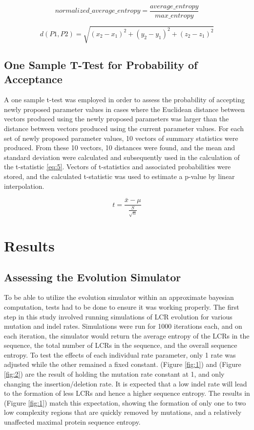 \documentclass[10pt]{article}
\providecommand{\figref}[1]{(Figure \ref{#1})}  %
\begin{document}
\begin{equation}
	normalized\_average\_entropy = \frac{average\_entropy}{max\_entropy}
	\label{eq:3}
\end{equation}

\begin{equation}
	d(P1,P2) = \sqrt{(x_2-x_1)^2 + (y_2-y_1)^2 + (z_2-z_1)^2 }
	\label{eq:4}
\end{equation}

\subsection{One Sample T-Test for Probability of Acceptance}

A one sample t-test was employed in order to assess the probability of accepting newly proposed parameter values in cases where the Euclidean distance between vectors produced using the newly proposed parameters was larger than the distance between vectors produced using the current parameter values. For each set of newly proposed parameter values, 10 vectors of summary statistics were produced. From these 10 vectors, 10 distances were found, and the mean and standard deviation were calculated and subsequently used in the calculation of the t-statistic \eqref{eq:5}. Vectors of t-statistics and associated probabilities were stored, and the calculated t-statistic was used to estimate a p-value by linear interpolation.

\begin{equation}
	t = \frac{\bar{x}-\mu}{\frac{S}{\sqrt{n}}}
	\label{eq:5}
\end{equation}

\section{Results}

\subsection{Assessing the Evolution Simulator}

To be able to utilize the evolution simulator within an approximate bayesian computation, tests had to be done to ensure it was working properly. The first step in this study involved running simulations of LCR evolution for various mutation and indel rates. Simulations were run for 1000 iterations each, and on each iteration, the simulator would return the average entropy of the LCRs in the sequence, the total number of LCRs in the sequence, and the overall sequence entropy. To test the effects of each individual rate parameter, only 1 rate was adjusted while the other remained a fixed constant. \figref{fig:1} and \figref{fig:2} are the result of holding the mutation rate constant at 1, and only changing the insertion/deletion rate. It is expected that a low indel rate will lead to the formation of less LCRs and hence a higher sequence entropy. The results in \figref{fig:1} match this expectation, showing the formation of only one to two low complexity regions that are quickly removed by mutations, and a relatively unaffected maximal protein sequence entropy. 
\end{document}
